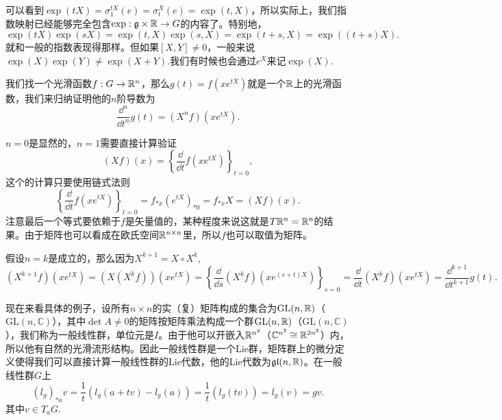 \documentclass[11pt]{article}
\theoremstyle{definition}
\theoremstyle{plain}
\newcommand{\cc}{\mathbb{C}}
\newcommand{\lag}{{\mathfrak{g}}}
\begin{document}
可以看到$\exp(tX)=\sigma^{tX}_1(e)=\sigma^{X}_t(e)=\exp(t,X)$，所以实际上，我们指数映射已经能够完全包含$\exp:\lag\times \rr\to G$的内容了。特别地，
\[
	\exp(tX)\exp(sX)=\exp(t,X)\exp(s,X)=\exp(t+s,X)=\exp((t+s)X).
\]
就和一般的指数表现得那样。但如果$[X,Y]\neq 0$，一般来说$\exp(X)\exp(Y)\neq \exp(X+Y)$.我们有时候也会通过$e^{X}$来记$\exp(X)$.

\lem \label{exp}我们找一个光滑函数$f:G\to \mathbb{R}^n$，那么$g(t)=f(xe^{tX})$就是一个$\mathbb{R}$上的光滑函数，我们来归纳证明他的$n$阶导数为
\[
	\frac{\dd^n}{\dd t^n}g(t)=(X^nf)(x e^{tX}).
\]

\proof $n=0$是显然的，$n=1$需要直接计算验证
\[
	(Xf)(x)=\left\{\frac{\dd}{\dd t}f(x e^{tX})\right\}_{t=0},
\]
这个的计算只要使用链式法则
\[
	\left\{\frac{\dd}{\dd t}f(x e^{tX})\right\}_{t=0}=f_{*x}(e^{tX})_{*0}=f_{*x}X=(Xf)(x).
\]
注意最后一个等式要依赖于$f$是矢量值的，某种程度来说这就是$T\mathbb{R}^n=\mathbb{R}^n$的结果。由于矩阵也可以看成在欧氏空间$\mathbb{R}^{n\times n}$里，所以$f$也可以取值为矩阵。

假设$n=k$是成立的，那么因为$X^{k+1}=X\circ X^k$,
\[
	(X^{k+1}f)(x e^{tX})=(X(X^{k}f))(x e^{tX})=\left\{\frac{\dd}{\dd s}(X^kf)(x e^{(s+t)X})\right\}_{s=0}=\frac{\dd}{\dd t}(X^kf)(x e^{tX})=\frac{\dd^{k+1}}{\dd t^{k+1}}g(t).
\]\endproof



\para 现在来看具体的例子，设所有$n\times n$的实（复）矩阵构成的集合为$\mathrm{GL}(n,\mathbb{R})$（$\mathrm{GL}(n,\cc)$），其中$\det A\neq 0$的矩阵按矩阵乘法构成一个群$\mathrm{GL}(n,\mathbb{R})$（$\mathrm{GL}(n,\cc)$），我们称为一般线性群，单位元是$I$。由于他可以开嵌入$\mathbb{R}^{n^2}$（$\cc^{n^2}\cong \rr^{2n^2}$）内，所以他有自然的光滑流形结构。因此一般线性群是一个Lie群，矩阵群上的微分定义使得我们可以直接计算一般线性群的Lie代数，他的Lie代数为$\mathfrak{gl}(n,\mathbb{R})$。在一般线性群$G$上
\[
	(l_g)_{*a}v=\frac{1}{t}(l_g(a+tv)-l_g(a))
	=\frac{1}{t}(l_g(tv))=l_g(v)=gv.
\]
其中$v\in T_aG$.
\end{document}
